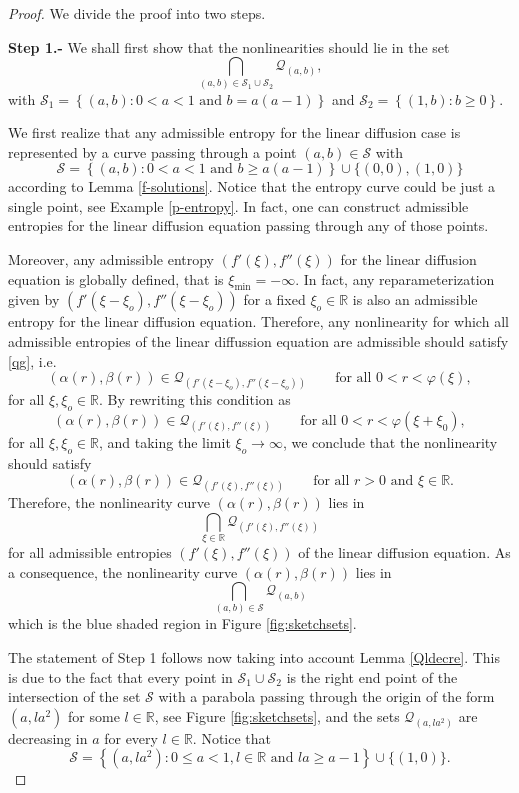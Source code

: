 \documentclass[reqno]{amsart}
\newcommand{\R}{\mathbb{R}}
\begin{document}
\begin{proof}
We divide the proof into two steps.

{\bf Step 1.-} We shall first show that the nonlinearities should lie in the set
$$
\bigcap_{(a,b)\in\mathcal{S}_1\cup \mathcal{S}_2} \mathcal{Q}_{(a,b)},
$$
with
$\mathcal{S}_1=\left\{(a,b): 0<a<1 \mbox{ and } b= a (a-1) \right\}$ and  $\mathcal{S}_2=\left\{(1,b): b\ge 0 \right\}$.

We first realize that any admissible entropy for the linear diffusion case is represented by a curve passing through a point $(a,b)\in \mathcal{S}$ with
$$
\mathcal{S}=\left\{(a,b): 0<a<1 \mbox{ and } b\ge  a (a-1) \right\}\cup\{(0,0),(1,0)\}
$$
according to Lemma \ref{f-solutions}. Notice that the entropy curve could be just a single point, see Example \ref{p-entropy}. In fact, one can construct admissible entropies for the linear diffusion equation passing through any of those points. 

Moreover, any admissible entropy $(f'(\xi),f''(\xi))$ for the linear diffusion equation is globally defined, that is $\xi_{\min}=-\infty$. In fact, any reparameterization given by $(f'(\xi-\xi_o),f''(\xi-\xi_o))$ for a fixed $\xi_o \in \R$ is also an admissible entropy for the linear diffusion equation. Therefore, any nonlinearity for which all admissible entropies of the linear diffussion equation are admissible should satisfy \eqref{qg}, i.e.
$$
 (\alpha(r),\beta(r))\in\mathcal{Q}_{(f'(\xi-\xi_o),f''(\xi-\xi_o))} \qquad \mbox{for all } 0<r<\varphi(\xi)  ,
$$
for all $\xi,\xi_o\in\R$. By rewriting this condition as
$$
 (\alpha(r),\beta(r))\in\mathcal{Q}_{(f'(\xi),f''(\xi))} \qquad \mbox{for all } 0<r<\varphi(\xi+\xi_0)  ,
$$
for all $\xi,\xi_o\in\R$, and taking the limit $\xi_o\to\infty$, we conclude that the nonlinearity should satisfy
$$
 (\alpha(r),\beta(r))\in\mathcal{Q}_{(f'(\xi),f''(\xi))} \qquad \mbox{for all } r>0 \mbox{ and } \xi\in\R.
$$
Therefore, the nonlinearity curve $(\alpha(r),\beta(r))$ lies in
$$
\bigcap_{\xi\in\R} \mathcal{Q}_{(f'(\xi),f''(\xi))}
$$
for all admissible entropies $(f'(\xi),f''(\xi))$ of the linear diffusion equation. As a consequence, the nonlinearity curve $(\alpha(r),\beta(r))$ lies in
$$
\bigcap_{(a,b)\in\mathcal{S}} \mathcal{Q}_{(a,b)} 
$$
which is the blue shaded region in Figure \ref{fig:sketchsets}.



The statement of Step 1 follows now taking into account Lemma \ref{Qldecre}. This is due to the fact that every point in $\mathcal{S}_1\cup \mathcal{S}_2$ is the right end point of the intersection of the set $\mathcal{S}$ with a parabola passing through the origin of the form $(a,l a^2)$ for some $l \in \R$, see Figure \ref{fig:sketchsets}, and the sets $\mathcal{Q}_{(a,l a^2)}$ are decreasing in $a$ for every $l\in\R$. Notice that
$$
\mathcal{S}=\left\{(a,l a^2): 0\leq a < 1, l\in \R \mbox{ and } l a\ge  a-1 \right\}\cup\{(1,0)\}.
$$


\end{proof}
\end{document}
